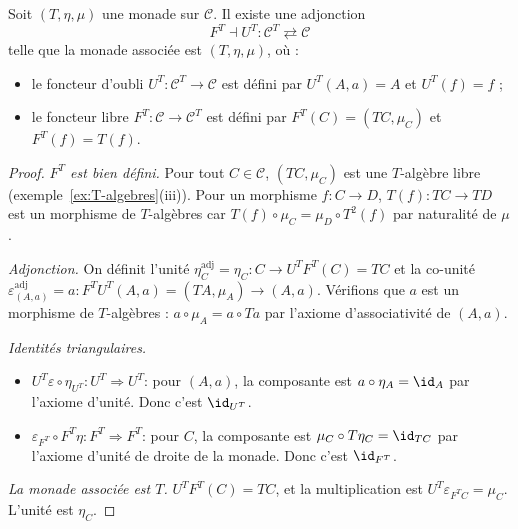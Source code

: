 \begin{theoreme}\label{thm:adjonction-EM}
Soit $(T, \eta, \mu)$ une monade sur $\mathcal{C}$.
Il existe une adjonction
\[
    F^T \dashv U^T \colon \mathcal{C}^T \rightleftarrows \mathcal{C}
\]
telle que la monade associée est $(T, \eta, \mu)$, où :
\begin{itemize}
    \item le foncteur d'oubli $U^T \colon \mathcal{C}^T \to \mathcal{C}$
    est défini par $U^T(A, a) = A$ et $U^T(f) = f$ ;
    \item le foncteur libre $F^T \colon \mathcal{C} \to \mathcal{C}^T$
    est défini par $F^T(C) = (TC, \mu_C)$ et
    $F^T(f) = T(f)$.
\end{itemize}
\end{theoreme}

\begin{proof}
\emph{$F^T$ est bien défini.}
Pour tout $C \in \mathcal{C}$, $(TC, \mu_C)$ est une $T$-algèbre
libre (exemple~\ref{ex:T-algebres}(iii)).
Pour un morphisme $f \colon C \to D$, $T(f) \colon TC \to TD$ est
un morphisme de $T$-algèbres car
$T(f) \circ \mu_C = \mu_D \circ T^2(f)$ par naturalité de $\mu$.

\emph{Adjonction.}
On définit l'unité $\eta^{\mathrm{adj}}_C = \eta_C \colon C \to U^T F^T(C) = TC$
et la co-unité $\varepsilon^{\mathrm{adj}}_{(A,a)} = a \colon F^T U^T(A,a)
= (TA, \mu_A) \to (A,a)$.
Vérifions que $a$ est un morphisme de $T$-algèbres :
$a \circ \mu_A = a \circ Ta$ par l'axiome d'associativité de $(A,a)$.

\emph{Identités triangulaires.}
\begin{itemize}
    \item $U^T \varepsilon \circ \eta_{U^T} \colon U^T \Rightarrow U^T$:
    pour $(A,a)$, la composante est $a \circ \eta_A = \id_A$
    par l'axiome d'unité. Donc c'est $\id_{U^T}$.

    \item $\varepsilon_{F^T} \circ F^T\eta \colon F^T \Rightarrow F^T$:
    pour $C$, la composante est $\mu_C \circ T\eta_C = \id_{TC}$
    par l'axiome d'unité de droite de la monade. Donc c'est $\id_{F^T}$.
\end{itemize}

\emph{La monade associée est $T$.}
$U^T F^T(C) = TC$, et la multiplication est
$U^T \varepsilon_{F^T C} = \mu_C$. L'unité est $\eta_C$.
\end{proof}


